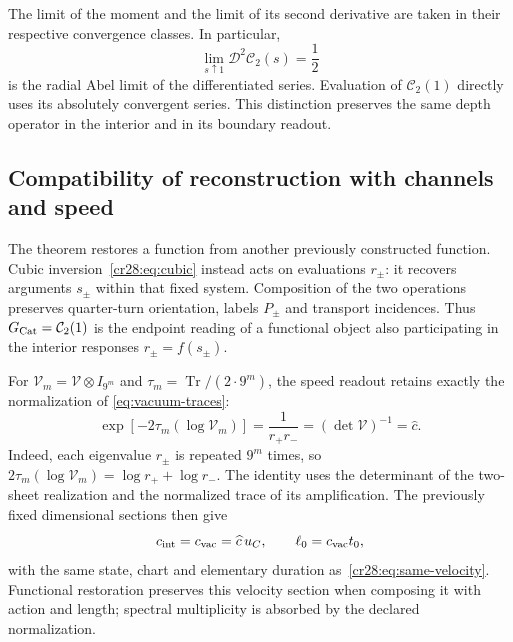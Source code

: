 The limit of the moment and the limit of its second derivative are
taken in their respective convergence classes. In particular,
\[
 \lim_{s\uparrow1}\mathcal D^2\mathcal C_2(s)=\frac12
\]
is the radial Abel limit of the differentiated series. Evaluation
of $\mathcal C_2(1)$ directly uses its absolutely convergent
series. This distinction preserves the same depth operator in
the interior and in its boundary readout.

\subsection{Compatibility of reconstruction with channels and speed}
\label{cr28:sec:channels-velocity}

The theorem restores a function from another previously constructed function. Cubic inversion~\eqref{cr28:eq:cubic} instead acts on evaluations $r_\pm$: it recovers arguments $s_\pm$ within that fixed system. Composition of the two operations preserves quarter-turn orientation, labels $P_\pm$ and transport incidences. Thus $G_{\rm Cat}=\mathcal C_2(1)$ is the endpoint reading of a functional object also participating in the interior responses $r_\pm=f(s_\pm)$.

For $\mathcal V_m=\mathcal V\otimes I_{9^m}$ and
$\tau_m=\operatorname{Tr}/(2\cdot9^m)$, the speed readout
retains exactly the normalization of
\eqref{eq:vacuum-traces}:
\begin{equation}
 \exp[-2\tau_m(\log\mathcal V_m)]
   =\frac1{r_+r_-}
   =(\det\mathcal V)^{-1}=\widehat c.
 \label{cr28:eq:velocity-normalized}
\end{equation}
Indeed, each eigenvalue $r_\pm$ is repeated $9^m$ times, so
$2\tau_m(\log\mathcal V_m)=\log r_++\log r_-$.
The identity uses the determinant of the two-sheet realization
and the normalized trace of its amplification. The previously fixed
dimensional sections then give
\[
 c_{\rm int}=c_{\rm vac}=\widehat c\,u_C,
 \qquad \ell_0=c_{\rm vac}t_0,
\]
with the same state, chart and elementary duration as~\eqref{cr28:eq:same-velocity}. Functional restoration preserves this velocity section when composing it with action and length; spectral multiplicity is absorbed by the declared normalization.


